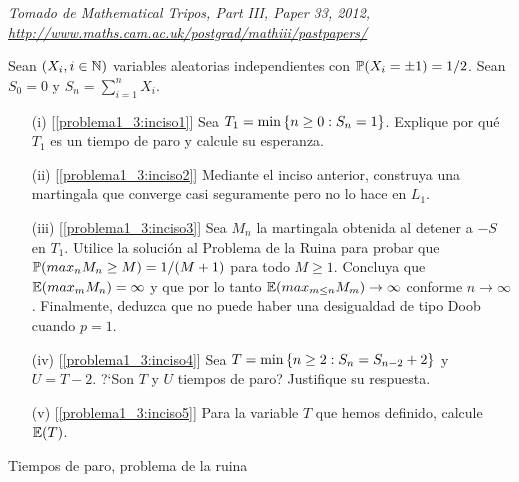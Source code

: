 \begin{problema}
	\emph{Tomado de Mathematical Tripos, Part III, Paper 33, 2012, \url{http://www.maths.cam.ac.uk/postgrad/mathiii/pastpapers/}}

	Sean $\left( X_i,i\in\mathbb{N}\right) $ variables aleatorias 
	independientes con $\mathbb{P}\! \left( X_i=\pm 1 \right)=1/2$. Sean $S_0=0$ y $S_n=\sum_{i=1}^n X_i$. 

	\begin{enumerate}
		\item[(i)]		[\ref{problema1_3:inciso1}]
		 Sea $T_1=\min\left\{ n\geq 0:S_n=1\right\} $. Explique por qu\'e $T_1$ es un 
		tiempo de paro y calcule su esperanza.
		
		\item[(ii)]		[\ref{problema1_3:inciso2}] 
		Mediante el inciso anterior, construya una martingala que converge 
		casi seguramente pero no lo hace en $L_1$.
		
		\item[(iii)]	[\ref{problema1_3:inciso3}] 
		Sea $M_n$ la martingala obtenida al detener a $-S$ en $T_1$. Utilice la solución al
		Problema de la Ruina para probar que \\
		$\mathbb{P}(max_n M_n \geq M) = 1/(M+1)$ para todo $M \geq 1$. Concluya que
		$\mathbb{E}(max_m M_n) = \infty$ y que por lo tanto $\mathbb{E}(max_{m\leq n} M_m) \rightarrow \infty$ conforme 
		$n \rightarrow \infty$. Finalmente, deduzca que no puede haber una desigualdad de tipo Doob cuando $p=1$.
		
		\item[(iv)] 	[\ref{problema1_3:inciso4}]
		Sea $T=\min\left\{ n\geq 2:S_n=S_{n-2} + 2\right\} $ y $U=T-2$. ?`Son $T$ y $U$ 
		tiempos de paro? Justifique su respuesta.
		
		\item[(v)]		[\ref{problema1_3:inciso5}]
		Para la variable $T$ que hemos definido, calcule $\mathbb{E}\! \left( T \right)$. 
	\end{enumerate}

	 Tiempos de paro, problema de la ruina
\end{problema}
